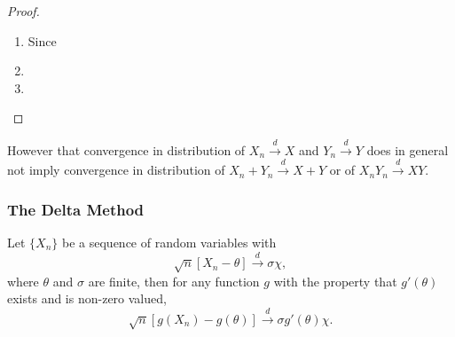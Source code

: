 \begin{proof}
    \begin{enumerate}
        \item
              Since
        \item

        \item

    \end{enumerate}
\end{proof}

\begin{note}
    However that convergence in distribution of $X_{n}\stackrel{d}{\rightarrow}X$ and $Y_{n}\stackrel{d}{\rightarrow}Y$ does in general not imply convergence in distribution of $X_n+Y_n\stackrel{d}{\rightarrow}X+Y$ or of $X_nY_n\stackrel{d}{\rightarrow}XY$.
\end{note}

\begin{theorem} \label{thm:cramer-wold-theorem}

\end{theorem}

\subsubsection{The Delta Method}

\begin{theorem}
    Let $\{X_{n}\}$ be a sequence of random variables with
    \begin{equation*}
        \sqrt{n}\left[X_{n}-\theta\right] \stackrel{d}{\rightarrow}\sigma\chi,
    \end{equation*}
    where $\theta$ and $\sigma$ are finite, then for any function $g$ with the property that $g'(\theta)$ exists and is non-zero valued,
    \begin{equation*}
        \sqrt{n}\left[g\left(X_{n}\right)-g(\theta)\right] \stackrel{d}{\rightarrow} \sigma g'(\theta)\chi.
    \end{equation*}
\end{theorem}

